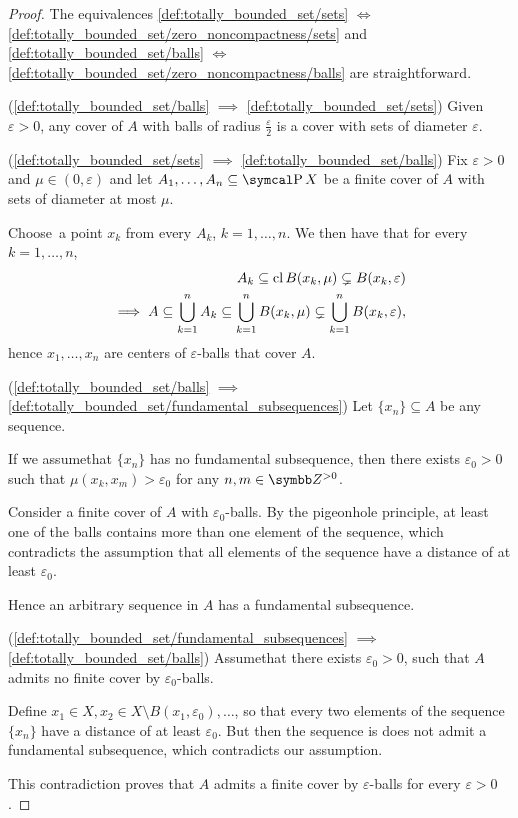 \begin{proof}
  The equivalences \ref{def:totally_bounded_set/sets} \( \iff \) \ref{def:totally_bounded_set/zero_noncompactness/sets} and \ref{def:totally_bounded_set/balls} \( \iff \) \ref{def:totally_bounded_set/zero_noncompactness/balls} are straightforward.

  (\ref{def:totally_bounded_set/balls} \( \implies \) \ref{def:totally_bounded_set/sets}) Given \( \varepsilon > 0 \), any cover of \( A \) with balls of radius \( \frac \varepsilon 2 \) is a cover with sets of diameter \( \varepsilon \).

  (\ref{def:totally_bounded_set/sets} \( \implies \) \ref{def:totally_bounded_set/balls}) Fix \( \varepsilon > 0 \) and \( \mu \in (0, \varepsilon) \) and let \( A_1, \ldots, A_n \subseteq \Power X \) be a finite cover of \( A \) with sets of diameter at most \( \mu \).

  Choose\AOC~a point \( x_k \) from every \( A_k \), \( k = 1, \ldots, n \). We then have that for every \( k = 1, \ldots, n \),
  \begin{align*}
    A_k \subseteq \operatorname{cl} B(x_k, \mu) \subsetneq B(x_k, \varepsilon)
    \\
    \implies A \subseteq \bigcup_{k=1}^n A_k \subseteq \bigcup_{k=1}^n B(x_k, \mu) \subsetneq \bigcup_{k=1}^n B(x_k, \varepsilon),
  \end{align*}
  hence \( x_1, \ldots, x_n \) are centers of \( \varepsilon \)-balls that cover \( A \).

  (\ref{def:totally_bounded_set/balls} \( \implies \) \ref{def:totally_bounded_set/fundamental_subsequences}) Let \( \{ x_n \} \subseteq A \) be any sequence.

  If we assume\LEM that \( \{ x_n \} \) has no fundamental subsequence, then there exists \( \varepsilon_0 > 0 \) such that \( \mu(x_k, x_m) > \varepsilon_0 \) for any \( n, m \in \BB{Z}^{>0} \).

  Consider a finite cover of \( A \) with \( \varepsilon_0 \)-balls. By the pigeonhole principle, at least one of the balls contains more than one element of the sequence, which contradicts the assumption that all elements of the sequence have a distance of at least \( \varepsilon_0 \).

  Hence an arbitrary sequence in \( A \) has a fundamental subsequence.

  (\ref{def:totally_bounded_set/fundamental_subsequences} \( \implies \) \ref{def:totally_bounded_set/balls}) Assume\LEM that there exists \( \varepsilon_0 > 0 \), such that \( A \) admits no finite cover by \( \varepsilon_0 \)-balls.

  Define \( x_1 \in X, x_2 \in X \setminus B(x_1, \varepsilon_0), \ldots \), so that every two elements of the sequence \( \{ x_n \} \) have a distance of at least \( \varepsilon_0 \). But then the sequence is does not admit a fundamental subsequence, which contradicts our assumption.

  This contradiction proves that \( A \) admits a finite cover by \( \varepsilon \)-balls for every \( \varepsilon > 0 \).
\end{proof}

